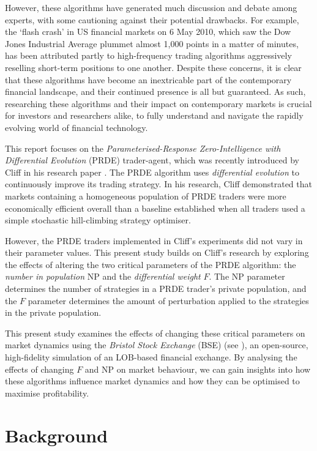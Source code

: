 \documentclass[conference]{IEEEtran}
\begin{document}
However, these algorithms have generated much discussion and debate among experts, with some cautioning against their potential drawbacks.
For example, the `flash crash' in US financial markets on 6 May 2010, which saw the Dow Jones Industrial Average plummet almost 1,000 points in a matter of minutes, has been attributed partly to high-frequency trading algorithms aggressively reselling short-term positions to one another.
Despite these concerns, it is clear that these algorithms have become an inextricable part of the contemporary financial landscape, and their continued presence is all but guaranteed.
As such, researching these algorithms and their impact on contemporary markets is crucial for investors and researchers alike, to fully understand and navigate the rapidly evolving world of financial technology.

This report focuses on the \textit{Parameterised-Response Zero-Intelligence with Differential Evolution} (PRDE) trader-agent, which was recently introduced by Cliff in his research paper \cite{PRDE}.
The PRDE algorithm uses \textit{differential evolution} \cite{StornPrice} to continuously improve its trading strategy.
In his research, Cliff demonstrated that markets containing a homogeneous population of PRDE traders were more economically efficient overall than a baseline established when all traders used a simple stochastic hill-climbing strategy optimiser.

However, the PRDE traders implemented in Cliff's experiments did not vary in their parameter values.
This present study builds on Cliff's research by exploring the effects of altering the two critical parameters of the PRDE algorithm: the \textit{number in population} $\mathrm{NP}$ and the \textit{differential weight} $F$.
The $\mathrm{NP}$ parameter determines the number of strategies in a PRDE trader's private population, and the $F$ parameter determines the amount of perturbation applied to the strategies in the private population.

This present study examines the effects of changing these critical parameters on market dynamics using the \textit{Bristol Stock Exchange} (BSE) (see \cite{BSE, BSEPaper}), an open-source, high-fidelity simulation of an LOB-based financial exchange.
By analysing the effects of changing $F$ and $\mathrm{NP}$ on market behaviour, we can gain insights into how these algorithms influence market dynamics and how they can be optimised to maximise profitability.

\section{Background}
\end{document}
